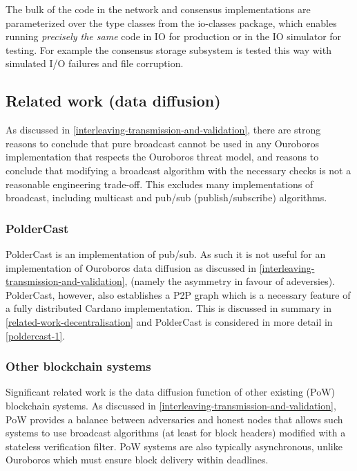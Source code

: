 \documentclass[11pt,a4paper]{article}
\begin{document}
The bulk of the code in the network and consensus implementations are
parameterized over the type classes from the io-classes package,
which enables running \emph{precisely the same} code in IO for
production or in the IO simulator for testing. For example the consensus
storage subsystem is tested this way with simulated I/O failures and
file corruption.

\subsection{Related work (data diffusion)}
\label{related-work-data-diffusion}

As discussed in
\cref{interleaving-transmission-and-validation}, there are strong reasons to conclude that pure broadcast cannot
be used in any Ouroboros implementation that respects the Ouroboros
threat model, and reasons to conclude that modifying a broadcast
algorithm with the necessary checks is not a reasonable engineering
trade-off. This excludes many implementations of broadcast, including
multicast and pub/sub (publish/subscribe) algorithms.

\subsubsection{PolderCast}
\label{poldercast}

PolderCast \cite{SSVV12} is an implementation of pub/sub. As such it is
not useful for an implementation of Ouroboros data diffusion as
discussed in
\cref{interleaving-transmission-and-validation}, (namely the asymmetry in favour of adeversies). PolderCast,
however, also establishes a P2P graph which is a necessary feature of a
fully distributed Cardano implementation. This is discussed in summary
in \cref{related-work-decentralisation} and PolderCast is considered in
more detail in \cref{poldercast-1}.

\subsubsection{Other blockchain systems}
\label{other-blockchain-systems}

Significant related work is the data diffusion function of other
existing (PoW) blockchain systems. As discussed in
\cref{interleaving-transmission-and-validation}, PoW provides a balance between adversaries and honest nodes
that allows such systems to use broadcast algorithms (at least for block
headers) modified with a stateless verification filter. PoW systems are
also typically asynchronous, unlike Ouroboros which must ensure block
delivery within deadlines.
\end{document}

